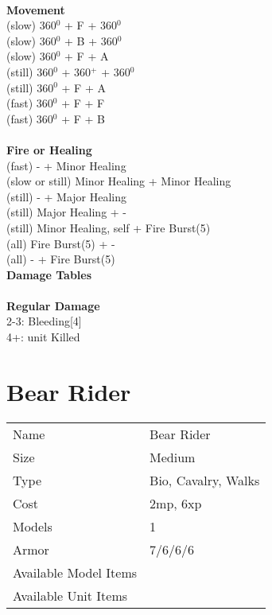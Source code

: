 \ \\ {\bf Movement } \\
(slow) 360$^0$ + F + 360$^0$ \\
(slow) 360$^0$ + B + 360$^0$ \\
(slow) 360$^0$ + F + A \\
(still) 360$^0$ + 360$^+$ + 360$^0$ \\
(still) 360$^0$ + F + A \\
(fast) 360$^0$ + F + F \\
(fast) 360$^0$ + F + B \\
\ \\ {\bf Fire or Healing } \\
(fast) - + Minor Healing \\
(slow or still) Minor Healing + Minor Healing \\
(still) - + Major Healing \\
(still) Major Healing + - \\
(still) Minor Healing, self + Fire Burst(5)  \\
(all) Fire Burst(5) + - \\
(all) - + Fire Burst(5) \\



{\bf Damage Tables} \\
\ \\ {\bf Regular Damage } \\
2-3: Bleeding[4] \\
4+: unit Killed \\









\pagebreak

\section{ Bear Rider }

\begin{tabular}{ll}
  Name & Bear Rider \\
  Size & Medium\\
  Type & Bio, Cavalry, Walks\\
  Cost & 2mp, 6xp\\
  Models & 1\\
  Armor & 7/6/6/6\\
  Available Model Items &  \\
  Available Unit Items &  \\
\end{tabular}


